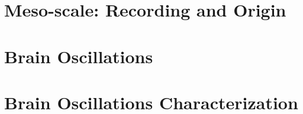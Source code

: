\documentclass[12pt]{article}
\begin{document}
\section{Meso-scale: Recording and Origin}
\graphicspath{ {./images/9/} }

\newpage

\section{Brain Oscillations}
\graphicspath{ {./images/10/} }

\newpage

\section{Brain Oscillations Characterization}
\graphicspath{ {./images/11/} }

\newpage

% 

% 

% 
\end{document}

